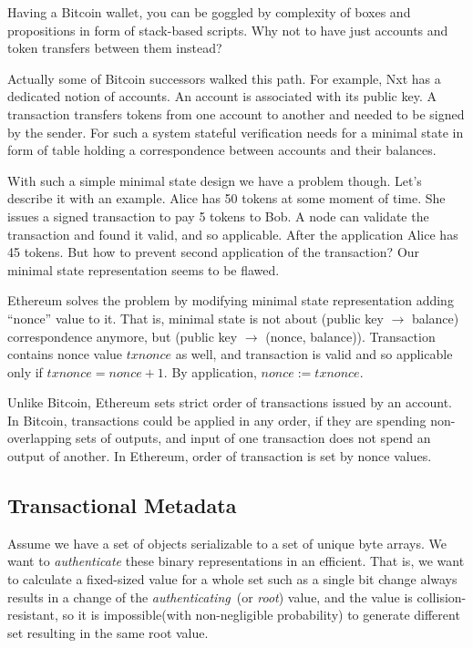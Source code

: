 \documentclass[]{report}   %
\begin{document}
Having a Bitcoin wallet, you can be goggled by complexity of boxes and propositions in form of stack-based scripts. Why not to have just accounts and token transfers between them instead? 

Actually some of Bitcoin successors walked this path. For example, Nxt has a dedicated notion of accounts. An account is associated with its public key. A transaction transfers tokens from one account to another and needed to be signed by the sender. For such a system stateful verification needs for a minimal state in form of table holding a correspondence between accounts and their balances.

With such a simple minimal state design we have a problem though. Let's describe it with an example. Alice has 50 tokens at some moment of time. She issues a signed transaction to pay 5 tokens to Bob. A node can validate the transaction and found it valid, and so applicable. After the application Alice has 45 tokens. But how to prevent second application of the transaction? Our minimal state representation seems to be flawed.

Ethereum solves the problem by modifying minimal state representation adding ``nonce'' value to it. That is, minimal state is not about (public key $\rightarrow$ balance) correspondence anymore, but (public key $\rightarrow$ (nonce, balance)). Transaction contains nonce value \(txnonce\) as well, and transaction is valid and so applicable only if \(txnonce = nonce + 1\). By application, \(nonce := txnonce\). 

Unlike Bitcoin, Ethereum sets strict order of transactions issued by an account. In Bitcoin, transactions could be applied in any order, 
if they are spending non-overlapping sets of outputs, and input of one transaction does not spend an output of another. In Ethereum, order of transaction is set by nonce values. 



\subsection{Transactional Metadata}

Assume we have a set of objects serializable to a set of unique byte arrays. We want to \textit{authenticate} these binary representations in an efficient. That is, we want to calculate a fixed-sized value for a whole set such as a single bit change always results in a change of the \textit{authenticating}~(or \textit{root}) value, and the value is collision-resistant, so it is impossible(with non-negligible probability) to generate different set resulting in the same root value. 
\end{document}
